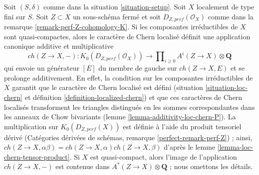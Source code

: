\begin{remark}
\label{remark-localized-chern-character-K}
Soit $(S, \delta)$ comme dans la situation \ref{situation-setup}.
Soit $X$ localement de type fini sur $S$.
Soit $Z \subset X$ un sous-schéma fermé et soit
$D_{Z, perf}(\mathcal{O}_X)$ comme dans la
remarque \ref{remark-perf-Z-cohomology-K}.
Si les composantes irréductibles de $X$ sont quasi-compactes, alors
le caractère de Chern localisé définit une application canonique additive
et multiplicative
$$
ch(Z \to X, -) : K_0(D_{Z, perf}(\mathcal{O}_X)) \longrightarrow
\prod\nolimits_{i \geq 0} A^i(Z \to X) \otimes \mathbf{Q}
$$
qui envoie un générateur $[E]$ du membre de gauche sur
$ch(Z \to X, E)$ et se prolonge additivement.
En effet, la condition sur les composantes irréductibles de $X$ garantit que le
caractère de Chern localisé est défini (situation \ref{situation-loc-chern} et
définition \ref{definition-localized-chern})
et que ces caractères de Chern localisés
transforment les triangles distingués en les
sommes correspondantes dans les anneaux de Chow bivariants
(lemme \ref{lemma-additivity-loc-chern-P}).
La multiplication sur
$K_0(D_{Z, perf}(X))$ est définie à l'aide du produit tensoriel dérivé
(Catégories dérivées de schémas, remarque \ref{perfect-remark-perf-Z}) ;
ainsi, $ch(Z \to X, \alpha \beta) = ch(Z \to X, \alpha) ch(Z \to X, \beta)$ d'après le
lemme \ref{lemma-loc-chern-tensor-product}.
Si $X$ est quasi-compact, alors l'image de l'application $ch(Z \to X, -)$ est
contenue dans $A^*(Z \to X) \otimes \mathbf{Q}$ ; nous omettons
les détails.
\end{remark}

